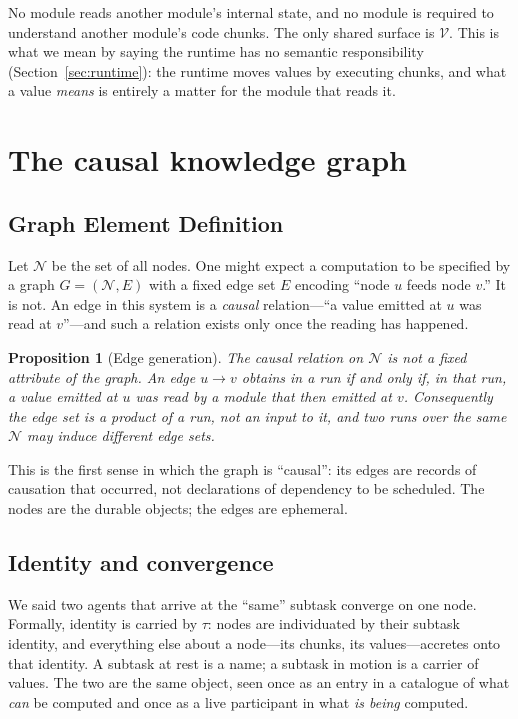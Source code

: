\documentclass[11pt,a4paper,twocolumn]{article}
\newtheorem{proposition}[theorem]{Proposition}
\theoremstyle{definition}
\newcommand{\Nodes}{\mathcal{N}}
\newcommand{\Vals}{\mathcal{V}}
\begin{document}
No module reads another module's internal state, and no module is required to
understand another module's code chunks. The only shared surface is
$\Vals$. This is what we mean by saying the runtime has no semantic
responsibility (Section~\ref{sec:runtime}): the runtime moves values by
executing chunks, and what a value \emph{means} is entirely a matter for the
module that reads it.

\section{The causal knowledge graph}
\label{sec:graph}

\subsection{Graph Element Definition}

Let $\Nodes$ be the set of all nodes. One might expect a computation to be
specified by a graph $G = (\Nodes, E)$ with a fixed edge set $E$ encoding ``node
$u$ feeds node $v$.'' It is not. An edge in this system is a \emph{causal}
relation---``a value emitted at $u$ was read at $v$''---and such a relation
exists only once the reading has happened.

\begin{proposition}[Edge generation]
\label{prop:no-edges}
The causal relation on $\Nodes$ is not a fixed attribute of the graph. An edge
$u \to v$ obtains in a run if and only if, in that run, a value emitted at $u$
was read by a module that then emitted at $v$. Consequently the edge set is a
\emph{product} of a run, not an \emph{input} to it, and two runs over the same
$\Nodes$ may induce different edge sets.
\end{proposition}

\noindent This is the first sense in which the graph is ``causal'': its edges are
records of causation that occurred, not declarations of dependency to be
scheduled. The nodes are the durable objects; the edges are ephemeral.

\subsection{Identity and convergence}

We said two agents that arrive at the ``same'' subtask converge on one node.
Formally, identity is carried by $\tau$: nodes are individuated by their subtask
identity, and everything else about a node---its chunks, its values---accretes
onto that identity. A subtask at rest is a name; a subtask in motion is a
carrier of values. The two are the same object, seen once as an entry in a
catalogue of what \emph{can} be computed and once as a live participant in what
\emph{is being} computed.
\end{document}

